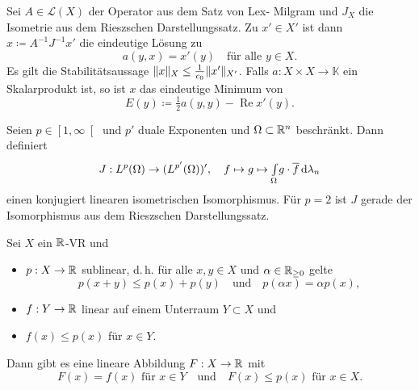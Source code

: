 \documentclass{cheat-sheet}
\newcommand{\K}{\mathbb{K}}
\newcommand{\LSO}{\mathcal{L}} %
\renewcommand{\Re}{\operatorname{Re}} %
\begin{document}
\begin{kor}
  Sei $A \in \LSO(X)$ der Operator aus dem Satz von Lex- Milgram und $J_X$ die Isometrie aus dem Rieszschen Darstellungssatz. Zu $x' \in X'$ ist dann $x \coloneqq A^{-1} J^{-1} x'$ die eindeutige Lösung zu
  \[ a(y, x) = x'(y) \quad \text{für alle $y \in X$.} \]
  Es gilt die Stabilitätsaussage $\lVert x\rVert_X \leq \tfrac{1}{c_0} \lVert x'\rVert_{X'}$.
  Falls $a : X {\times} X \to \K$ ein Skalarprodukt ist, so ist $x$ das eindeutige Minimum von
  \[ E(y) \coloneqq \tfrac{1}{2} a(y, y) - \Re x'(y). \]
\end{kor}


%



\begin{satz}
  Seien $p \in \left[ 1, \infty \right[$ und $p'$ duale Exponenten und $\Omega \subset \mathbb{R}^n$ beschränkt. Dann definiert
  \[ J : L^p(\Omega) \to (L^{p'}(\Omega))', \quad f \mapsto g \mapsto {\textstyle \int\limits_{\Omega}^{}} g \cdot \overline{f} \,\mathrm{d} \lambda_n \]
  einen konjugiert linearen isometrischen Isomorphismus. Für $p=2$ ist $J$ gerade der Isomorphismus aus dem Rieszschen Darstellungssatz.
\end{satz}





\begin{satz}
  Sei $X$ ein $\mathbb{R}$-VR und
  \begin{itemize}
    \item $p : X \to \mathbb{R}$ sublinear, d.\,h. für alle $x, y \in X$ und $\alpha \in \mathbb{R}_{\geq 0}$ gelte
    \[ p(x+y) \leq p(x) + p(y) \quad \text{und} \quad p(\alpha x) = \alpha p(x), \]
    \item $f : Y \to \mathbb{R}$ linear auf einem Unterraum $Y \subset X$ und
    \item $f(x) \leq p(x)$ für $x \in Y$.
  \end{itemize}
  Dann gibt es eine lineare Abbildung $F : X \to \mathbb{R}$ mit
  \[ F(x) = f(x) \text{ für $x \in Y$} \quad \text{und} \quad F(x) \leq p(x) \text{ für } x \in X. \]
\end{satz}
\end{document}
